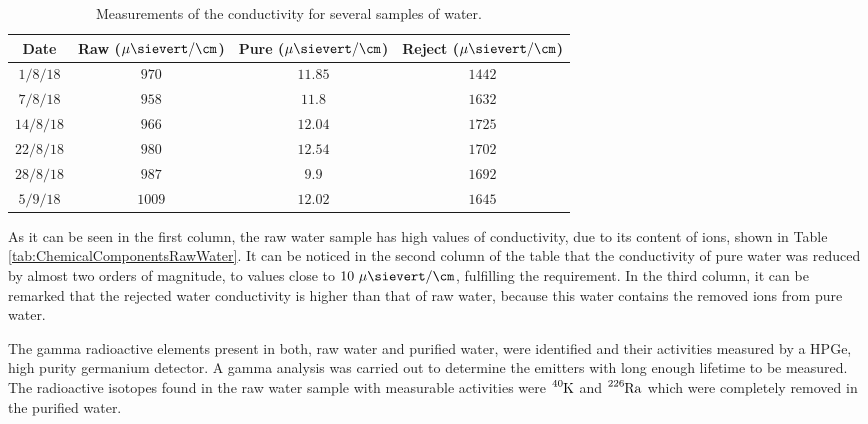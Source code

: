 \begin{table}[htbp]
\begin{center}
\begin{tabular}{|c|c|c|c|}
\hline
Date & Raw ($\mu\sievert/\cm$) & Pure ($\mu\sievert/\cm$) & Reject ($\mu\sievert/\cm$) \\
\hline \hline \hline
$1/8/18$ & $970$ & $11.85$ & $1442$ \\ \hline
$7/8/18$ & $958$ & $11.8$ & $1632$ \\ \hline
$14/8/18$ & $966$ & $12.04$ & $1725$ \\ \hline
$22/8/18$ & $980$ & $12.54$ & $1702$ \\ \hline
$28/8/18$ & $987$ & $9.9$ & $1692$ \\ \hline
$5/9/18$ & $1009$ & $12.02$ & $1645$ \\ \hline
\end{tabular}
\caption{Measurements of the conductivity for several samples of water.}
\label{tab:ConductivityValues}
\end{center}
\end{table}	

As it can be seen in the first column, the raw water sample has high values of conductivity, due to its content of ions, shown in Table \ref{tab:ChemicalComponentsRawWater}. It can be noticed in the second column of the table that the conductivity of pure water was reduced by almost two orders of magnitude, to values close to $10~\mu\sievert/\cm$, fulfilling the requirement. In the third column, it can be remarked that the rejected water conductivity is higher than that of raw water, because this water contains the removed ions from pure water.

The gamma radioactive elements present in both, raw water and purified water, were identified and their activities measured by a HPGe, high purity germanium detector. A gamma analysis was carried out to determine the emitters with long enough lifetime to be measured. The radioactive isotopes found in the raw water sample with measurable activities were $\ce{^{40}K}$ and $\ce{^{226}Ra}$ which were completely removed in the purified water.


